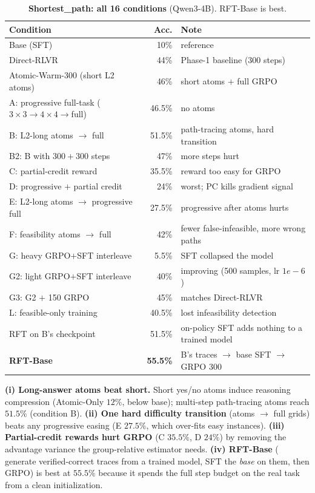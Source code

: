 \documentclass{article}
\begin{document}
\begin{table}[h]
\centering\small
\caption{\textbf{Shortest\_path: all 16 conditions} (Qwen3-4B). RFT-Base is best.}
\label{tab:sp}
\begin{tabular}{lrl}
\toprule
Condition & Acc. & Note\\
\midrule
Base (SFT)                                  & 10\%   & reference\\
Direct-RLVR                                 & 44\%   & Phase-1 baseline (300 steps)\\
Atomic-Warm-300 (short L2 atoms)            & 46\%   & short atoms $+$ full GRPO\\
A: progressive full-task ($3{\times}3{\to}4{\times}4{\to}$full) & 46.5\% & no atoms\\
B: L2-long atoms $\to$ full                 & 51.5\% & path-tracing atoms, hard transition\\
B2: B with $300{+}300$ steps                & 47\%   & more steps hurt\\
C: partial-credit reward                    & 35.5\% & reward too easy for GRPO\\
D: progressive $+$ partial credit           & 24\%   & worst; PC kills gradient signal\\
E: L2-long atoms $\to$ progressive full     & 27.5\% & progressive after atoms hurts\\
F: feasibility atoms $\to$ full             & 42\%   & fewer false-infeasible, more wrong paths\\
G: heavy GRPO$+$SFT interleave              & 5.5\%  & SFT collapsed the model\\
G2: light GRPO$+$SFT interleave             & 40\%   & improving (500 samples, lr $1{e}{-}6$)\\
G3: G2 $+$ 150 GRPO                          & 45\%   & matches Direct-RLVR\\
L: feasible-only training                   & 40.5\% & lost infeasibility detection\\
RFT on B's checkpoint                        & 51.5\% & on-policy SFT adds nothing to a trained model\\
\textbf{RFT-Base}                            & \textbf{55.5\%} & B's traces $\to$ base SFT $\to$ GRPO 300\\
\bottomrule
\end{tabular}
\end{table}

\textbf{(i) Long-answer atoms beat short.} Short yes/no atoms induce reasoning compression
(Atomic-Only $12\%$, below base); multi-step path-tracing atoms reach $51.5\%$ (condition B).
\textbf{(ii) One hard difficulty transition} (atoms $\to$ full grids) beats any progressive easing
(E $27.5\%$, which over-fits easy instances). \textbf{(iii) Partial-credit rewards hurt GRPO}
(C $35.5\%$, D $24\%$) by removing the advantage variance the group-relative estimator needs.
\textbf{(iv) RFT-Base} ( generate verified-correct traces from a trained model, SFT the
\emph{base} on them, then GRPO) is best at $55.5\%$ because it spends the full step budget on the
real task from a clean initialization.
\end{document}
